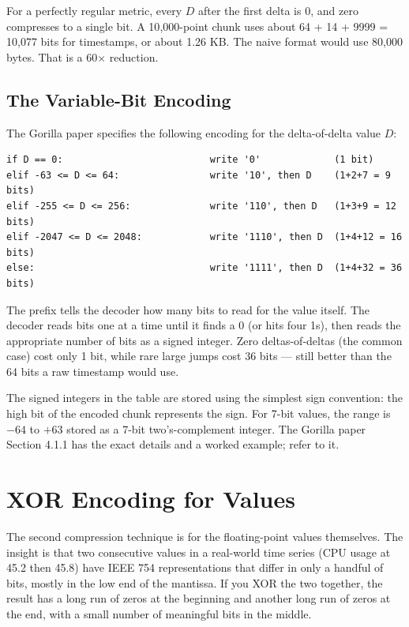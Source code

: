 \documentclass[11pt,a4paper]{article}
\begin{document}
For a perfectly regular metric, every $D$ after the first delta is 0, and zero compresses to a single bit. A 10{,}000-point chunk uses about 64 + 14 + 9999 = 10{,}077 bits for timestamps, or about 1.26 KB. The naive format would use 80{,}000 bytes. That is a 60$\times$ reduction.

\subsection{The Variable-Bit Encoding}
The Gorilla paper specifies the following encoding for the delta-of-delta value $D$:

\begin{codebox}
\begin{lstlisting}
if D == 0:                          write '0'             (1 bit)
elif -63 <= D <= 64:                write '10', then D    (1+2+7 = 9 bits)
elif -255 <= D <= 256:              write '110', then D   (1+3+9 = 12 bits)
elif -2047 <= D <= 2048:            write '1110', then D  (1+4+12 = 16 bits)
else:                               write '1111', then D  (1+4+32 = 36 bits)
\end{lstlisting}
\end{codebox}

The prefix tells the decoder how many bits to read for the value itself. The decoder reads bits one at a time until it finds a 0 (or hits four 1s), then reads the appropriate number of bits as a signed integer. Zero deltas-of-deltas (the common case) cost only 1 bit, while rare large jumps cost 36 bits --- still better than the 64 bits a raw timestamp would use.

The signed integers in the table are stored using the simplest sign convention: the high bit of the encoded chunk represents the sign. For 7-bit values, the range is $-64$ to $+63$ stored as a 7-bit two's-complement integer. The Gorilla paper Section 4.1.1 has the exact details and a worked example; refer to it.

\section{XOR Encoding for Values}

The second compression technique is for the floating-point values themselves. The insight is that two consecutive values in a real-world time series (CPU usage at 45.2 then 45.8) have IEEE 754 representations that differ in only a handful of bits, mostly in the low end of the mantissa. If you XOR the two together, the result has a long run of zeros at the beginning and another long run of zeros at the end, with a small number of meaningful bits in the middle.
\end{document}
